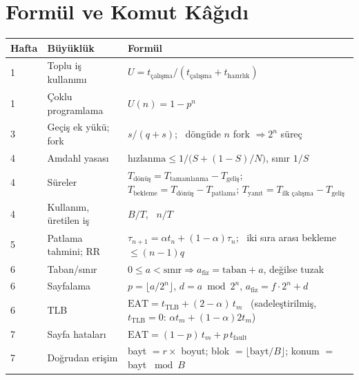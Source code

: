 \documentclass[11pt,a4paper]{article}
\begin{document}
\section{Formül ve Komut Kâğıdı}
\label{sec:sheet}

\begin{center}
\small
\renewcommand{\arraystretch}{1.25}
\begin{tabularx}{\linewidth}{@{}l>{\raggedright\arraybackslash}p{3.1cm}>{\raggedright\arraybackslash}X@{}}
\toprule
\textbf{Hafta} & \textbf{Büyüklük} & \textbf{Formül} \\
\midrule
1 & Toplu iş kullanımı & $U = t_{\text{çalışma}}/(t_{\text{çalışma}} + t_{\text{hazırlık}})$ \\
1 & Çoklu programlama & $U(n) = 1 - p^{n}$ \\
3 & Geçiş ek yükü; fork & $s/(q+s)$; \ döngüde $n$ fork $\Rightarrow 2^{n}$ süreç \\
4 & Amdahl yasası & $\text{hızlanma} \le 1/\bigl(S + (1-S)/N\bigr)$, sınır $1/S$ \\
4 & Süreler & $T_{\text{dönüş}} = T_{\text{tamamlanma}} - T_{\text{geliş}}$; $T_{\text{bekleme}} = T_{\text{dönüş}} - T_{\text{patlama}}$; $T_{\text{yanıt}} = T_{\text{ilk çalışma}} - T_{\text{geliş}}$ \\
4 & Kullanım, üretilen iş & $B/T$, \ $n/T$ \\
5 & Patlama tahmini; RR & $\tau_{n+1} = \alpha t_n + (1-\alpha)\tau_n$; \ iki sıra arası bekleme $\le (n-1)q$ \\
6 & Taban/sınır & $0 \le a < \text{sınır} \Rightarrow a_{\text{fiz}} = \text{taban} + a$, değilse tuzak \\
6 & Sayfalama & $p = \lfloor a/2^{n}\rfloor$, $d = a \bmod 2^{n}$, $a_{\text{fiz}} = f\cdot 2^{n} + d$ \\
6 & TLB & $\text{EAT} = t_{\text{TLB}} + (2-\alpha)\,t_m$ \ (sadeleştirilmiş, $t_{\text{TLB}} = 0$: $\alpha t_m + (1-\alpha) 2t_m$) \\
7 & Sayfa hataları & $\text{EAT} = (1-p)\,t_m + p\,t_{\text{fault}}$ \\
7 & Doğrudan erişim & bayt $= r \times$ boyut; blok $= \lfloor \text{bayt}/B \rfloor$; konum $=$ bayt $\bmod B$ \\
\bottomrule
\end{tabularx}


\end{center}
\end{document}
